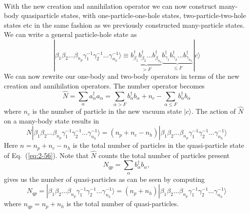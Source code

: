 \documentclass[%
twoside,                 %
final,                   %
10pt]{article}
\begin{document}
\paragraph{}
With the new creation and annihilation operator  we can now construct 
many-body quasiparticle states, with one-particle-one-hole states, two-particle-two-hole
states etc in the same fashion as we previously constructed many-particle states. 
We can write a general particle-hole state as
\begin{equation}
	|\beta_1\beta_2\dots \beta_{n_p} \gamma_1^{-1} \gamma_2^{-1} \dots \gamma_{n_h}^{-1}\rangle \equiv
		\underbrace{b_{\beta_1}^\dagger b_{\beta_2}^\dagger \dots b_{\beta_{n_p}}^\dagger}_{>F}
		\underbrace{b_{\gamma_1}^\dagger b_{\gamma_2}^\dagger \dots b_{\gamma_{n_h}}^\dagger}_{\leq F} |c\rangle \label{eq:2-56}
\end{equation}
We can now rewrite our one-body and two-body operators in terms of the new creation and annihilation operators.
The number operator becomes
\begin{equation}
	\hat{N} = \sum_\alpha a_\alpha^\dagger a_\alpha= 
\sum_{\alpha > F} b_\alpha^\dagger b_\alpha + n_c - \sum_{\alpha \leq F} b_\alpha^\dagger b_\alpha \label{eq:2-57b}
\end{equation}
where $n_c$ is the number of particle in the new vacuum state $|c\rangle $.  
The action of $\hat{N}$ on a many-body state results in 
\begin{equation}
	N |\beta_1\beta_2\dots \beta_{n_p} \gamma_1^{-1} \gamma_2^{-1} \dots \gamma_{n_h}^{-1}\rangle = (n_p + n_c - n_h) |\beta_1\beta_2\dots \beta_{n_p} \gamma_1^{-1} \gamma_2^{-1} \dots \gamma_{n_h}^{-1}\rangle \label{2-59}
\end{equation}
Here  $n=n_p +n_c - n_h$ is the total number of particles in the quasi-particle state of 
Eq.~(\ref{eq:2-56}). Note that  $\hat{N}$ counts the total number of particles  present 
\begin{equation}
	N_{qp} = \sum_\alpha b_\alpha^\dagger b_\alpha, \label{eq:2-60}
\end{equation}
gives us the number of quasi-particles as can be seen by computing
\begin{equation}
	N_{qp}= |\beta_1\beta_2\dots \beta_{n_p} \gamma_1^{-1} \gamma_2^{-1} \dots \gamma_{n_h}^{-1}\rangle
		= (n_p + n_h)|\beta_1\beta_2\dots \beta_{n_p} \gamma_1^{-1} \gamma_2^{-1} \dots \gamma_{n_h}^{-1}\rangle \label{eq:2-61}
\end{equation}
where $n_{qp} = n_p + n_h$ is the total number of quasi-particles.
\end{document}
